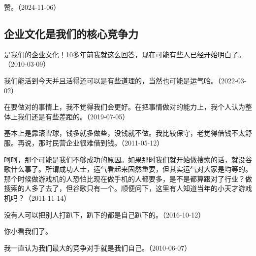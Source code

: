 赞。（2024-11-06）

\subsection{企业文化是我们的核心竞争力}


是我们的企业文化！10多年前我就这么回答，现在可能有些人已经开始明白了。（2010-03-09）

我们能活到今天并且活得还可以是有些道理的，当然也可能是运气哈。（2022-03-02）


在要做对的事情上，我不觉得我们会更好。在把事情做对的能力上，我个人认为整体上我们还是有些差距的。（2019-07-05）


基本上是靠滚雪球，钱多就多做些，没钱就不做。我比较保守，老觉得借钱不太舒服。再说，那时民营企业很难借到钱。（2011-05-12）


呵呵，那个可能是我们不够成功的原因。如果那时我们就开始做搜索的话，就没谷歌什么事了。所谓成功人士，运气看起来固然重要，但其实运气对大家是均等的。那个时候做游戏机的人恐怕比现在做手机的人都要多，是不是都算跟对了行业？做搜索的人多了去了，但谷歌只有一个。顺便问下，这里有人知道当年的小天才游戏机吗？（2011-11-14）


没有人可以把别人打趴下，趴下的都是自己趴下的。（2016-10-12）


你小看我们了。


我一直认为我们最大的竞争对手就是我们自己。（2010-06-07）

